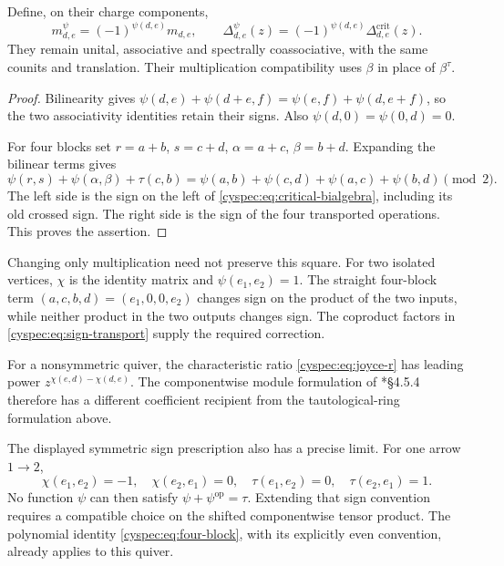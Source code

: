 \begin{proposition}
\label{cyspec:prop:sign-transport}
Define, on their charge components,
\begin{equation}\label{cyspec:eq:sign-transport}
 m^\psi_{d,e}=(-1)^{\psi(d,e)}m_{d,e},\qquad
 \Delta^\psi_{d,e}(z)=(-1)^{\psi(d,e)}
                         \Delta^{\mathrm{crit}}_{d,e}(z).
\end{equation}
They remain unital, associative and spectrally coassociative,
with the same counits and translation. Their multiplication
compatibility uses $\beta$ in place of $\beta^\tau$.
\end{proposition}

\begin{proof}
Bilinearity gives
$\psi(d,e)+\psi(d+e,f)=\psi(e,f)+\psi(d,e+f)$,
so the two associativity identities retain their signs.
Also $\psi(d,0)=\psi(0,d)=0$.

For four blocks set $r=a+b$, $s=c+d$, $\alpha=a+c$, $\beta=b+d$.
Expanding the bilinear terms gives
\[
 \psi(r,s)+\psi(\alpha,\beta)+\tau(c,b)
 =\psi(a,b)+\psi(c,d)+\psi(a,c)+\psi(b,d)\pmod2.
\]
The left side is the sign on the left of
\eqref{cyspec:eq:critical-bialgebra}, including its old crossed sign.
The right side is the sign of the four transported operations.
This proves the assertion.
\end{proof}

Changing only multiplication need not preserve this square.
For two isolated vertices, $\chi$ is the identity matrix and
$\psi(e_1,e_2)=1$. The straight four-block term
$(a,c,b,d)=(e_1,0,0,e_2)$ changes sign on the product of the two
inputs, while neither product in the two outputs changes sign.
The coproduct factors in \eqref{cyspec:eq:sign-transport} supply
the required correction.

For a nonsymmetric quiver, the characteristic ratio
\eqref{cyspec:eq:joyce-r} has leading power
$z^{\chi(e,d)-\chi(d,e)}$. The componentwise module formulation
of \cite{cyspec:JKL}*{\S4.5.4} therefore has a different coefficient
recipient from the tautological-ring formulation above.

The displayed symmetric sign prescription also has a precise limit.
For one arrow $1\to2$,
\[
 \chi(e_1,e_2)=-1,\quad\chi(e_2,e_1)=0,\quad
 \tau(e_1,e_2)=0,\quad\tau(e_2,e_1)=1.
\]
No function $\psi$ can then satisfy $\psi+\psi^{\mathrm{op}}=\tau$.
Extending that sign convention requires a compatible choice on the
shifted componentwise tensor product. The polynomial identity
\eqref{cyspec:eq:four-block}, with its explicitly even convention,
already applies to this quiver.

